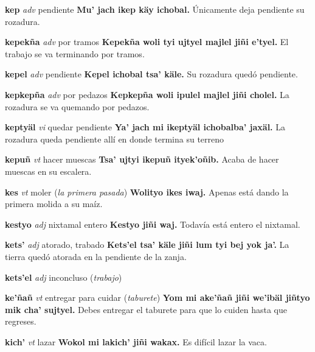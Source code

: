 \documentclass[10pt]{scrbook}
\newcommand{\entry}[1]{\textbf{#1}}
\newcommand{\partofspeech}[1]{\textit{#1}}
\newcommand{\spanishtranslation}[1]{#1}
\newcommand{\clarification}[1]{(\textit{#1})}
\newcommand{\cholexample}[1]{\textbf{#1}}
\newcommand{\exampletranslation}[1]{#1}
\begin{document}
\begin{multicols}{2}
\entry{kep}
\partofspeech{adv}
\spanishtranslation{pendiente}
\cholexample{Mu' jach ikep käy ichobal.}
\exampletranslation{Únicamente deja pendiente su rozadura.}

\entry{kepekña}
\partofspeech{adv}
\spanishtranslation{por tramos}
\cholexample{Kepekña woli tyi ujtyel majlel jiñi e'tyel.}
\exampletranslation{El trabajo se va terminando por tramos.}

\entry{kepel}
\partofspeech{adv}
\spanishtranslation{pendiente}
\cholexample{Kepel ichobal tsa' käle.}
\exampletranslation{Su rozadura quedó pendiente.}

\entry{kepkepña}
\partofspeech{adv}
\spanishtranslation{por pedazos}
\cholexample{Kepkepña woli ipulel majlel jiñi cholel.}
\exampletranslation{La rozadura se va quemando por pedazos.}

\entry{keptyäl}
\partofspeech{vi}
\spanishtranslation{quedar pendiente}
\cholexample{Ya' jach mi ikeptyäl ichobalba' jaxäl.}
\exampletranslation{La rozadura queda pendiente allí en donde termina su terreno}

\entry{kepuñ}
\partofspeech{vt}
\spanishtranslation{hacer muescas}
\cholexample{Tsa' ujtyi ikepuñ ityek'oñib.}
\exampletranslation{Acaba de hacer muescas en su escalera.}

\entry{kes}
\partofspeech{vt}
\spanishtranslation{moler}
\clarification{la primera pasada}
\cholexample{Wolityo ikes iwaj.}
\exampletranslation{Apenas está dando la primera molida a su maíz.}

\entry{kestyo}
\partofspeech{adj}
\spanishtranslation{nixtamal entero}
\cholexample{Kestyo jiñi waj.}
\exampletranslation{Todavía está entero el nixtamal.}

\entry{kets'}
\partofspeech{adj}
\spanishtranslation{atorado, trabado}
\cholexample{Kets'el tsa' käle jiñi lum tyi bej yok ja'.}
\exampletranslation{La tierra quedó atorada en la pendiente de la zanja.}

\entry{kets'el}
\partofspeech{adj}
\spanishtranslation{inconcluso}
\clarification{trabajo}

\entry{ke'ñañ}
\partofspeech{vt}
\spanishtranslation{entregar para cuidar}
\clarification{taburete}
\cholexample{Yom mi ake'ñañ jiñi we'ibäl jiñtyo mik cha' sujtyel.}
\exampletranslation{Debes entregar el taburete para que lo cuiden hasta que regreses.}

\entry{kich'}
\partofspeech{vt}
\spanishtranslation{lazar}
\cholexample{Wokol mi lakich' jiñi wakax.}
\exampletranslation{Es difícil lazar la vaca.}


\end{multicols}
\end{document}

